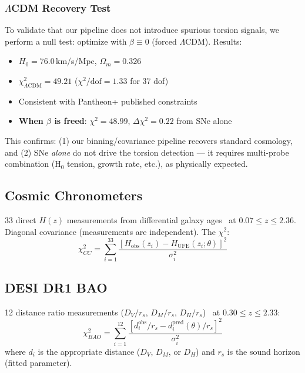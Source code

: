 \documentclass[twocolumn,showpacs,preprintnumbers,amsmath,amssymb,prl]{revtex4-2}
\begin{document}
\subsubsection{$\Lambda$CDM Recovery Test}

To validate that our pipeline does not introduce spurious torsion signals, we perform a null test: optimize with $\beta \equiv 0$ (forced $\Lambda$CDM). Results:
\begin{itemize}
\item $H_0 = 76.0$\,km/s/Mpc, $\Omega_m = 0.326$
\item $\chi^2_{\Lambda\text{CDM}} = 49.21$ ($\chi^2/\text{dof} = 1.33$ for 37 dof)
\item Consistent with Pantheon+ published constraints~\cite{Brout2022}
\item \textbf{When $\beta$ is freed}: $\chi^2 = 48.99$, $\Delta\chi^2 = 0.22$ from SNe alone
\end{itemize}

This confirms: (1) our binning/covariance pipeline recovers standard cosmology, and (2) SNe \textit{alone} do not drive the torsion detection --- it requires multi-probe combination (H$_0$ tension, growth rate, etc.), as physically expected.

\subsection{Cosmic Chronometers}

33 direct $H(z)$ measurements from differential galaxy ages~\cite{Moresco2016,Simon2005} at $0.07 \leq z \leq 2.36$. Diagonal covariance (measurements are independent). The $\chi^2$:
\begin{equation}
\chi^2_{CC} = \sum_{i=1}^{33} \frac{[H_\text{obs}(z_i) - H_\text{UFE}(z_i; \theta)]^2}{\sigma_i^2}
\end{equation}

\subsection{DESI DR1 BAO}

12 distance ratio measurements ($D_V/r_s$, $D_M/r_s$, $D_H/r_s$)~\cite{DESI2024} at $0.30 \leq z \leq 2.33$:
\begin{equation}
\chi^2_{BAO} = \sum_{i=1}^{12} \frac{[d_i^\text{obs}/r_s - d_i^\text{pred}(\theta)/r_s]^2}{\sigma_i^2}
\end{equation}
where $d_i$ is the appropriate distance ($D_V$, $D_M$, or $D_H$) and $r_s$ is the sound horizon (fitted parameter).
\end{document}
